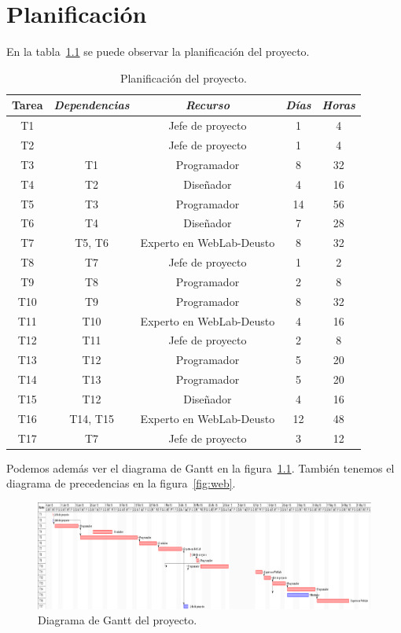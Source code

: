 \chapter{Planificación}

En la tabla~\ref{tab:plan} se puede observar la planificación del proyecto.

\begin{table}[h]
	\centering
	\caption{Planificación del proyecto.}\label{tab:plan}
	\begin{tabular}{ccccc}
		\toprule
		\textbf{Tarea} & \emph{Dependencias} & \emph{Recurso} & \emph{Días} & \emph{Horas} \\
		\midrule
		T1	&				& Jefe de proyecto			& 1		&	4	\\
		T2	&				& Jefe de proyecto			& 1		&	4	\\
		T3	&	T1			& Programador				& 8		&	32	\\
		T4	&	T2			& Diseñador					& 4		&	16	\\
		T5	&	T3			& Programador				& 14	&	56	\\
		T6	&	T4			& Diseñador					& 7		&	28	\\
		T7	&	T5, T6		& Experto en WebLab-Deusto	& 8		&	32	\\
		T8	&	T7			& Jefe de proyecto			& 1		&	2	\\
		T9	&	T8			& Programador				& 2		&	8	\\
		T10	&	T9			& Programador				& 8		&	32	\\
		T11	&	T10			& Experto en WebLab-Deusto	& 4		&	16	\\
		T12	&	T11			& Jefe de proyecto			& 2		&	8	\\
		T13	&	T12			& Programador				& 5		&	20	\\
		T14	&	T13			& Programador				& 5		&	20	\\
		T15	&	T12			& Diseñador					& 4		&	16	\\
		T16	&	T14, T15	& Experto en WebLab-Deusto	& 12	&	48	\\
		T17	&	T7			& Jefe de proyecto			& 3		&	12	\\
		\bottomrule
	\end{tabular}
\end{table}

Podemos además ver el diagrama de Gantt en la figura~\ref{fig:gantt}. También tenemos el diagrama de precedencias en la figura~\ref{fig:web}.

\begin{figure}
	\centering
	\includegraphics[width=\textheight, angle=-90]{fig/gantt}
	\caption{Diagrama de Gantt del proyecto.}\label{fig:gantt}
\end{figure}

